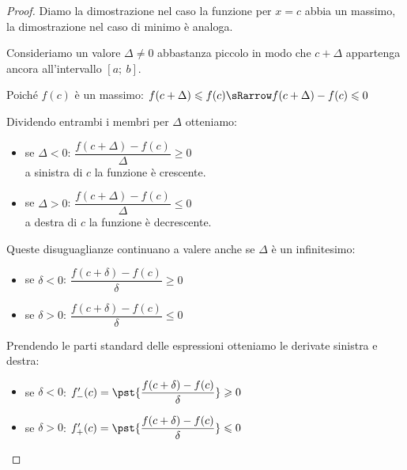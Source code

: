 \vspace{-10mm}                           %
\begin{proof}
Diamo la dimostrazione nel caso la funzione per \(x = c\) abbia un massimo, 
la dimostrazione nel caso di minimo è analoga.

Consideriamo un valore \(\Delta \neq 0\) abbastanza piccolo 
in modo che \(c+\Delta\) appartenga ancora all'intervallo \([a;~b]\).

Poiché \(f(c)\) è un massimo: \quad 
\(f(c+\Delta) \leqslant f(c) \sRarrow f(c+\Delta) - f(c) \leqslant 0\)

Dividendo entrambi i membri per \(\Delta\) otteniamo:
\begin{multicols}{2}
\begin{itemize} [nosep]
\item se \(\Delta < 0\): \quad 
\(\dfrac{f(c+\Delta) - f(c)}{\Delta} \geqslant 0\) \\
a sinistra di \(c\) la funzione è crescente.
\item se \(\Delta > 0\): \quad 
\(\dfrac{f(c+\Delta) - f(c)}{\Delta} \leqslant 0\) \\
a destra di \(c\) la funzione è decrescente.
\end{itemize}
\end{multicols}

Queste disuguaglianze continuano a valere anche se \(\Delta\) è un 
infinitesimo:
\begin{multicols}{2}
\begin{itemize} [nosep]
\item se \(\delta < 0\): \quad 
\(\dfrac{f(c+\delta) - f(c)}{\delta} \geqslant 0\)
\item se \(\delta > 0\): \quad 
\(\dfrac{f(c+\delta) - f(c)}{\delta} \leqslant 0\)
\end{itemize}
\end{multicols}

Prendendo le parti standard delle espressioni otteniamo le derivate 
sinistra e destra:
\begin{itemize} [nosep]
\item se \(\delta < 0\): \quad 
\(f'_-(c)=\pst{\dfrac{f(c+\delta) - f(c)}{\delta}} \geqslant 0\)
\item se \(\delta > 0\): \quad 
\(f'_+(c)=\pst{\dfrac{f(c+\delta) - f(c)}{\delta}} \leqslant 0\)
\end{itemize}



\end{proof}

